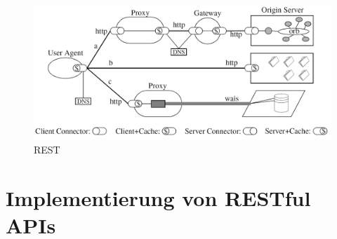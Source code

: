 \begin{figure}[h]
  \centering
  \includegraphics[width=\linewidth]{../Kapitel/Grafiken/REST-process-view.png}
  \caption{REST \cite[84]{REST}}
  \label{img:REST-diss}
\end{figure}

\section{Implementierung von RESTful APIs}

